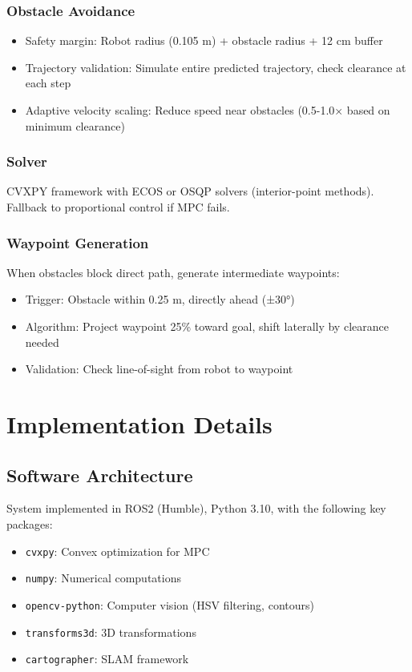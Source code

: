 \documentclass[11pt,a4paper]{article}
\begin{document}
\subsubsection{Obstacle Avoidance}

\begin{itemize}
    \item Safety margin: Robot radius (0.105 m) + obstacle radius + 12 cm buffer
    \item Trajectory validation: Simulate entire predicted trajectory, check clearance at each step
    \item Adaptive velocity scaling: Reduce speed near obstacles (0.5-1.0× based on minimum clearance)
\end{itemize}

\subsubsection{Solver}

CVXPY framework with ECOS or OSQP solvers (interior-point methods). Fallback to proportional control if MPC fails.

\subsubsection{Waypoint Generation}

When obstacles block direct path, generate intermediate waypoints:
\begin{itemize}
    \item Trigger: Obstacle within 0.25 m, directly ahead (±30°)
    \item Algorithm: Project waypoint 25\% toward goal, shift laterally by clearance needed
    \item Validation: Check line-of-sight from robot to waypoint
\end{itemize}

\section{Implementation Details}

\subsection{Software Architecture}

System implemented in ROS2 (Humble), Python 3.10, with the following key packages:
\begin{itemize}
    \item \texttt{cvxpy}: Convex optimization for MPC
    \item \texttt{numpy}: Numerical computations
    \item \texttt{opencv-python}: Computer vision (HSV filtering, contours)
    \item \texttt{transforms3d}: 3D transformations
    \item \texttt{cartographer}: SLAM framework
\end{itemize}
\end{document}
